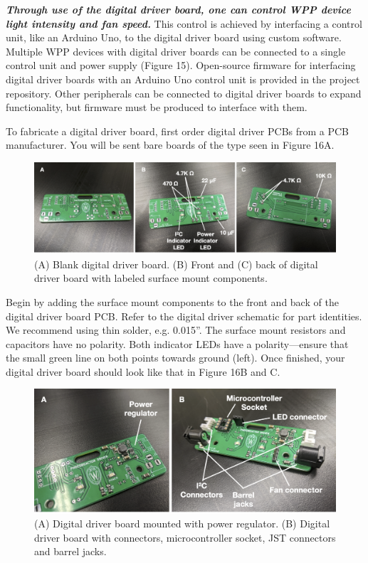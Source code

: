 \documentclass[11pt]{article}
\begin{document}
\textbf{\textit{Through use of the digital driver board, one can control WPP device light intensity and fan speed.}} This control is achieved by interfacing a control unit, like an Arduino Uno, to the digital driver board using custom software. Multiple WPP devices with digital driver boards can be connected to a single control unit and power supply (Figure 15). Open-source firmware for interfacing digital driver boards with an Arduino Uno control unit is provided in the project repository. Other peripherals can be connected to digital driver boards to expand functionality, but firmware must be produced to interface with them.

To fabricate a digital driver board, first order digital driver PCBs from a PCB manufacturer. You will be sent bare boards of the type seen in Figure 16A.

\begin{figure}[H]
	\centering
	\includegraphics[width=\textwidth]{"./fig16.png"}
	\caption{(A) Blank digital driver board. (B) Front and (C) back of digital driver board with labeled surface mount components.}
\end{figure}

Begin by adding the surface mount components to the front and back of the digital driver board PCB.
Refer to the digital driver schematic for part identities.
We recommend using thin solder, e.g. 0.015''.
The surface mount resistors and capacitors have no polarity.
Both indicator LEDs have a polarity---ensure that the small green line on both points towards ground (left).
Once finished, your digital driver board should look like that in Figure 16B and C.

\begin{figure}[H]
	\centering
	\includegraphics[width=\textwidth]{"./fig17.png"}
	\caption{(A) Digital driver board mounted with power regulator. (B) Digital driver board with connectors, microcontroller socket, JST connectors and barrel jacks.}
\end{figure}
\end{document}
